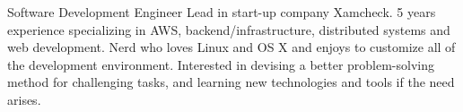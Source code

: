 

\begin{cvparagraph}

Software Development Engineer Lead in start-up company Xamcheck. 5 years experience specializing in AWS, backend/infrastructure, distributed systems and web development. Nerd who loves Linux and OS X and enjoys to customize all of the development environment. Interested in devising a better problem-solving method for challenging tasks, and learning new technologies and tools if the need arises.
\end{cvparagraph}
